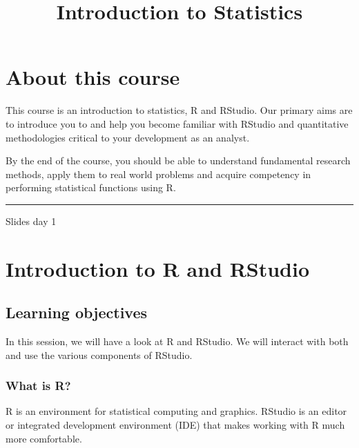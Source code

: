 \documentclass[]{article}
\title{Introduction to Statistics}
\author{}
\date{}
\begin{document}
\maketitle

{
\setcounter{tocdepth}{2}
\tableofcontents
}
\hypertarget{about-this-course}{%
\section*{About this course}\label{about-this-course}}

This course is an introduction to statistics, R and RStudio. Our primary aims are to introduce you to and help you become familiar with RStudio and quantitative methodologies critical to your development as an analyst.

By the end of the course, you should be able to understand fundamental research methods, apply them to real world problems and acquire competency in performing statistical functions using R.

\begin{center}\rule{0.5\linewidth}{\linethickness}\end{center}

Slides day 1

\hypertarget{introduction-to-r-and-rstudio}{%
\section{Introduction to R and RStudio}\label{introduction-to-r-and-rstudio}}

\hypertarget{learning-objectives}{%
\subsection{Learning objectives}\label{learning-objectives}}

In this session, we will have a look at R and RStudio. We will interact with both and use the various components of RStudio.

\hypertarget{what-is-r}{%
\subsubsection{What is R?}\label{what-is-r}}

R is an environment for statistical computing and graphics. RStudio is an editor or integrated development environment (IDE) that makes working with R much more comfortable.
\end{document}
